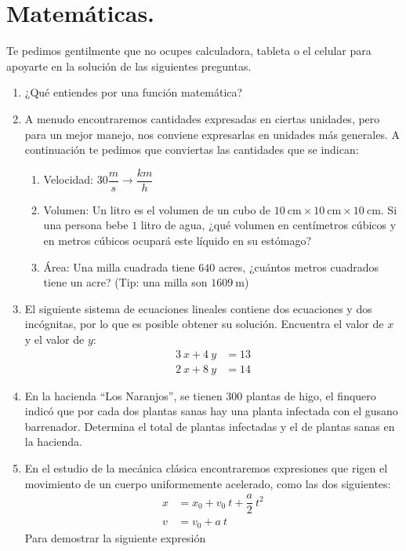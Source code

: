 \documentclass[12pt]{article}
\begin{document}
\section{Matemáticas.}
Te pedimos gentilmente que no ocupes calculadora, tableta o el celular para apoyarte en la solución de las siguientes preguntas.
\begin{enumerate}
\item ¿Qué entiendes por una función matemática?
\item A menudo encontraremos cantidades expresadas en ciertas unidades, pero para un mejor manejo, nos conviene expresarlas en unidades más generales. A continuación te pedimos que conviertas las cantidades que se indican:
\begin{enumerate}
    \item Velocidad: $30 \dfrac{m}{s} \rightarrow \dfrac{km}{h}$
    \item Volumen: Un litro es el volumen de un cubo de $ \SI{10}{\centi\metre} \times \SI{10}{\centi\metre} \times \SI{10}{\centi\metre}$. Si una persona bebe $1$ litro de agua, ¿qué volumen en centímetros cúbicos y en metros cúbicos ocupará este líquido en su estómago?
    \item Área: Una milla cuadrada tiene $640$ acres, ¿cuántos metros cuadrados tiene un acre? (Tip: una milla son $\SI{1609}{\meter}$)
\end{enumerate}
\item El siguiente sistema de ecuaciones lineales contiene dos ecuaciones y dos incógnitas, por lo que es posible obtener su solución. Encuentra el valor de $x$ y el valor de $y$:
\begin{align*}
3 \: x + 4 \: y &= 13 \\
2 \: x + 8 \: y &= 14
\end{align*}
\item En la hacienda \enquote{Los Naranjos}, se tienen 300 plantas de higo, el finquero indicó que por cada dos plantas sanas hay una planta infectada con el gusano barrenador. Determina el total de plantas infectadas y el de plantas sanas en la hacienda.
\item En el estudio de la mecánica clásica encontraremos expresiones que rigen el movimiento de un cuerpo uniformemente acelerado, como las dos siguientes:
\begin{align}
x &= x_{0} + v_{0} \: t + \dfrac{a}{2} \: t^{2} \label{eq:ecuacion_01} \\
v &= v_{0} + a \: t \label{eq:ecuacion_02}
\end{align}
Para demostrar la siguiente expresión

\end{enumerate}
\end{document}
